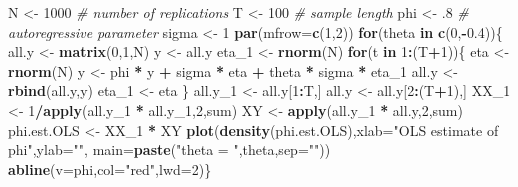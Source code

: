 \documentclass[
  12pt,
]{book}
\newenvironment{Shaded}{\begin{snugshade}}{\end{snugshade}}
\newcommand{\AttributeTok}[1]{\textcolor[rgb]{0.13,0.29,0.53}{#1}}
\newcommand{\CommentTok}[1]{\textcolor[rgb]{0.56,0.35,0.01}{\textit{#1}}}
\newcommand{\ControlFlowTok}[1]{\textcolor[rgb]{0.13,0.29,0.53}{\textbf{#1}}}
\newcommand{\DecValTok}[1]{\textcolor[rgb]{0.00,0.00,0.81}{#1}}
\newcommand{\FloatTok}[1]{\textcolor[rgb]{0.00,0.00,0.81}{#1}}
\newcommand{\FunctionTok}[1]{\textcolor[rgb]{0.13,0.29,0.53}{\textbf{#1}}}
\newcommand{\NormalTok}[1]{#1}
\newcommand{\OtherTok}[1]{\textcolor[rgb]{0.56,0.35,0.01}{#1}}
\newcommand{\SpecialCharTok}[1]{\textcolor[rgb]{0.81,0.36,0.00}{\textbf{#1}}}
\newcommand{\StringTok}[1]{\textcolor[rgb]{0.31,0.60,0.02}{#1}}
\theoremstyle{definition}
\theoremstyle{definition}
\theoremstyle{definition}
\theoremstyle{definition}
\theoremstyle{remark}
\begin{document}
\begin{Shaded}
\begin{Highlighting}[]
\NormalTok{N }\OtherTok{\textless{}{-}} \DecValTok{1000} \CommentTok{\# number of replications}
\NormalTok{T }\OtherTok{\textless{}{-}} \DecValTok{100} \CommentTok{\# sample length}
\NormalTok{phi }\OtherTok{\textless{}{-}}\NormalTok{ .}\DecValTok{8} \CommentTok{\# autoregressive parameter}
\NormalTok{sigma }\OtherTok{\textless{}{-}} \DecValTok{1}
\FunctionTok{par}\NormalTok{(}\AttributeTok{mfrow=}\FunctionTok{c}\NormalTok{(}\DecValTok{1}\NormalTok{,}\DecValTok{2}\NormalTok{))}
\ControlFlowTok{for}\NormalTok{(theta }\ControlFlowTok{in} \FunctionTok{c}\NormalTok{(}\DecValTok{0}\NormalTok{,}\SpecialCharTok{{-}}\FloatTok{0.4}\NormalTok{))\{}
\NormalTok{  all.y }\OtherTok{\textless{}{-}} \FunctionTok{matrix}\NormalTok{(}\DecValTok{0}\NormalTok{,}\DecValTok{1}\NormalTok{,N)}
\NormalTok{  y     }\OtherTok{\textless{}{-}}\NormalTok{ all.y}
\NormalTok{  eta\_1 }\OtherTok{\textless{}{-}} \FunctionTok{rnorm}\NormalTok{(N)}
  \ControlFlowTok{for}\NormalTok{(t }\ControlFlowTok{in} \DecValTok{1}\SpecialCharTok{:}\NormalTok{(T}\SpecialCharTok{+}\DecValTok{1}\NormalTok{))\{}
\NormalTok{    eta }\OtherTok{\textless{}{-}} \FunctionTok{rnorm}\NormalTok{(N)}
\NormalTok{    y }\OtherTok{\textless{}{-}}\NormalTok{ phi }\SpecialCharTok{*}\NormalTok{ y }\SpecialCharTok{+}\NormalTok{ sigma }\SpecialCharTok{*}\NormalTok{ eta }\SpecialCharTok{+}\NormalTok{ theta }\SpecialCharTok{*}\NormalTok{ sigma }\SpecialCharTok{*}\NormalTok{ eta\_1}
\NormalTok{    all.y }\OtherTok{\textless{}{-}} \FunctionTok{rbind}\NormalTok{(all.y,y)}
\NormalTok{    eta\_1 }\OtherTok{\textless{}{-}}\NormalTok{ eta}
\NormalTok{  \}}
\NormalTok{  all.y\_1 }\OtherTok{\textless{}{-}}\NormalTok{ all.y[}\DecValTok{1}\SpecialCharTok{:}\NormalTok{T,]}
\NormalTok{  all.y   }\OtherTok{\textless{}{-}}\NormalTok{ all.y[}\DecValTok{2}\SpecialCharTok{:}\NormalTok{(T}\SpecialCharTok{+}\DecValTok{1}\NormalTok{),]}
\NormalTok{  XX\_1 }\OtherTok{\textless{}{-}} \DecValTok{1}\SpecialCharTok{/}\FunctionTok{apply}\NormalTok{(all.y\_1 }\SpecialCharTok{*}\NormalTok{ all.y\_1,}\DecValTok{2}\NormalTok{,sum)}
\NormalTok{  XY   }\OtherTok{\textless{}{-}} \FunctionTok{apply}\NormalTok{(all.y\_1 }\SpecialCharTok{*}\NormalTok{ all.y,}\DecValTok{2}\NormalTok{,sum)}
\NormalTok{  phi.est.OLS }\OtherTok{\textless{}{-}}\NormalTok{ XX\_1 }\SpecialCharTok{*}\NormalTok{ XY}
  \FunctionTok{plot}\NormalTok{(}\FunctionTok{density}\NormalTok{(phi.est.OLS),}\AttributeTok{xlab=}\StringTok{"OLS estimate of phi"}\NormalTok{,}\AttributeTok{ylab=}\StringTok{""}\NormalTok{,}
       \AttributeTok{main=}\FunctionTok{paste}\NormalTok{(}\StringTok{"theta = "}\NormalTok{,theta,}\AttributeTok{sep=}\StringTok{""}\NormalTok{))}
  \FunctionTok{abline}\NormalTok{(}\AttributeTok{v=}\NormalTok{phi,}\AttributeTok{col=}\StringTok{"red"}\NormalTok{,}\AttributeTok{lwd=}\DecValTok{2}\NormalTok{)\}}
\end{Highlighting}
\end{Shaded}
\end{document}

